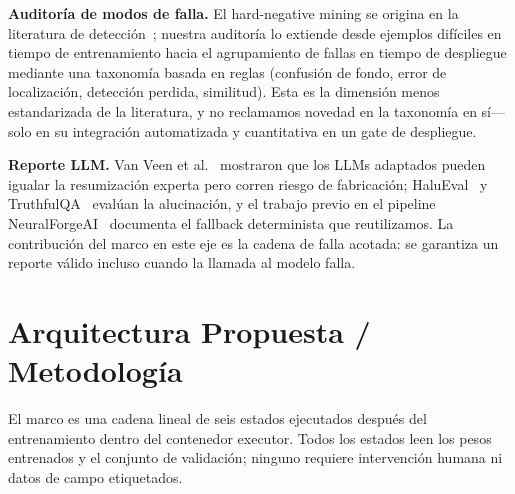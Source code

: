 \documentclass[10pt,twocolumn,letterpaper]{article}
\begin{document}
\textbf{Auditoría de modos de falla.} El hard-negative mining se origina en la literatura de detección~\cite{shrivastava2016training}; nuestra auditoría lo extiende desde ejemplos difíciles en tiempo de entrenamiento hacia el agrupamiento de fallas en tiempo de despliegue mediante una taxonomía basada en reglas (confusión de fondo, error de localización, detección perdida, similitud). Esta es la dimensión menos estandarizada de la literatura, y no reclamamos novedad en la taxonomía en sí---solo en su integración automatizada y cuantitativa en un gate de despliegue.

\textbf{Reporte LLM.} Van Veen et al.~\cite{vanveen2023adapted} mostraron que los LLMs adaptados pueden igualar la resumización experta pero corren riesgo de fabricación; HaluEval~\cite{li2023halueval} y TruthfulQA~\cite{lin2022truthfulqa} evalúan la alucinación, y el trabajo previo en el pipeline NeuralForgeAI~\cite{wyoloservice2} documenta el fallback determinista que reutilizamos. La contribución del marco en este eje es la cadena de falla acotada: se garantiza un reporte válido incluso cuando la llamada al modelo falla.

\section{Arquitectura Propuesta / Metodología}
\label{sec:arch}
El marco es una cadena lineal de seis estados ejecutados después del entrenamiento dentro del contenedor executor. Todos los estados leen los pesos entrenados y el conjunto de validación; ninguno requiere intervención humana ni datos de campo etiquetados.
\end{document}
